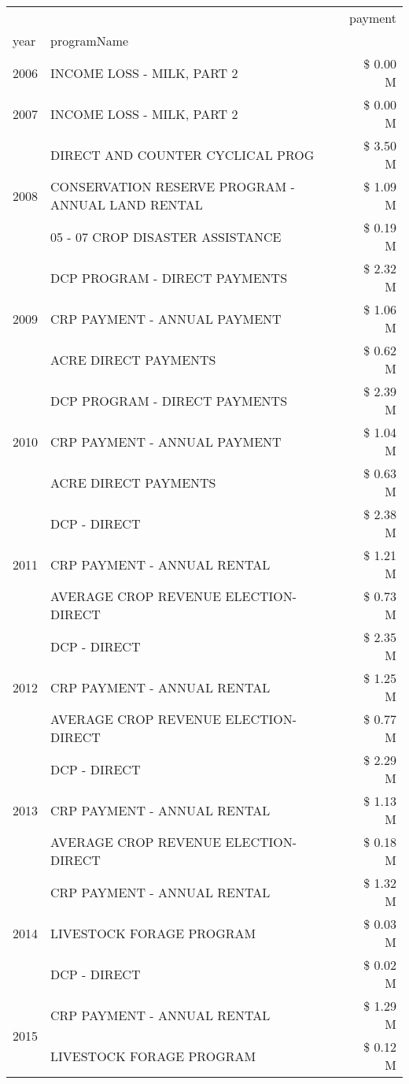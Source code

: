 \begin{tabular}{llr}
\toprule
 &  & payment \\
year & programName &  \\
\midrule
2006 & INCOME LOSS - MILK, PART 2 & \$ 0.00 M \\
\cline{1-3}
2007 & INCOME LOSS - MILK, PART 2 & \$ 0.00 M \\
\cline{1-3}
\multirow[t]{3}{*}{2008} & DIRECT AND COUNTER CYCLICAL PROG & \$ 3.50 M \\
 & CONSERVATION RESERVE PROGRAM - ANNUAL LAND RENTAL & \$ 1.09 M \\
 & 05 - 07 CROP DISASTER ASSISTANCE & \$ 0.19 M \\
\cline{1-3}
\multirow[t]{3}{*}{2009} & DCP PROGRAM - DIRECT PAYMENTS & \$ 2.32 M \\
 & CRP PAYMENT - ANNUAL PAYMENT & \$ 1.06 M \\
 & ACRE DIRECT PAYMENTS & \$ 0.62 M \\
\cline{1-3}
\multirow[t]{3}{*}{2010} & DCP PROGRAM - DIRECT PAYMENTS & \$ 2.39 M \\
 & CRP PAYMENT - ANNUAL PAYMENT & \$ 1.04 M \\
 & ACRE DIRECT PAYMENTS & \$ 0.63 M \\
\cline{1-3}
\multirow[t]{3}{*}{2011} & DCP - DIRECT & \$ 2.38 M \\
 & CRP PAYMENT - ANNUAL RENTAL & \$ 1.21 M \\
 & AVERAGE CROP REVENUE ELECTION-DIRECT & \$ 0.73 M \\
\cline{1-3}
\multirow[t]{3}{*}{2012} & DCP - DIRECT & \$ 2.35 M \\
 & CRP PAYMENT - ANNUAL RENTAL & \$ 1.25 M \\
 & AVERAGE CROP REVENUE ELECTION-DIRECT & \$ 0.77 M \\
\cline{1-3}
\multirow[t]{3}{*}{2013} & DCP - DIRECT & \$ 2.29 M \\
 & CRP PAYMENT - ANNUAL RENTAL & \$ 1.13 M \\
 & AVERAGE CROP REVENUE ELECTION-DIRECT & \$ 0.18 M \\
\cline{1-3}
\multirow[t]{3}{*}{2014} & CRP PAYMENT - ANNUAL RENTAL & \$ 1.32 M \\
 & LIVESTOCK FORAGE PROGRAM & \$ 0.03 M \\
 & DCP - DIRECT & \$ 0.02 M \\
\cline{1-3}
\multirow[t]{3}{*}{2015} & CRP PAYMENT - ANNUAL RENTAL & \$ 1.29 M \\
 & LIVESTOCK FORAGE PROGRAM & \$ 0.12 M \\

\end{tabular}
